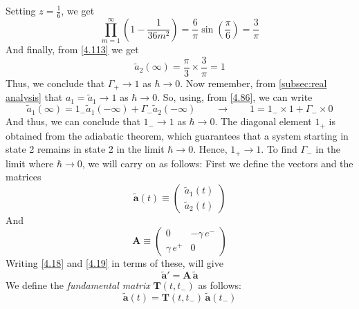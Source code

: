 \documentclass[12pt,a4paper]{article}
\begin{document}
	Setting $z = \frac{1}{6}$, we get
	\begin{equation}
		\prod_{m = 1}^{\infty} \left( 1 - \frac{1}{36m^{2}} \right) = \frac{6}{\pi} \sin(\frac{\pi}{6}) = \frac{3}{\pi} \label{4.116}
	\end{equation}
	And finally, from \eqref{4.113} we get
	\begin{equation}
		\tilde{a}_{2}(\infty) = \frac{\pi}{3} \times \frac{3}{\pi} = 1 \label{4.117}
	\end{equation}
	Thus, we conclude that $\Gamma_{+} \rightarrow 1$ as $\hbar \rightarrow 0$. Now remember, from \ref{subsec:real analysis} that $a_{1} = \tilde{a}_{1} \rightarrow 1$ as $\hbar \rightarrow 0$. So, using, from \eqref{4.86}, we can write
	\begin{equation}
		\tilde{a}_{1} (\infty) = 1_{-} \tilde{a}_{1}(-\infty) + \Gamma_{-} \tilde{a}_{2}(-\infty) \qquad \rightarrow \qquad 1 = 1_{-} \times 1 + \Gamma_{-} \times 0 \label{4.118}
	\end{equation}
	And thus, we can conclude that $1_{-} \rightarrow 1$ as $\hbar \rightarrow 0$. The diagonal element $1_+$ is obtained from the adiabatic theorem, which guarantees that a system starting in state 2 remains in state 2 in the limit $\hbar \to 0$. Hence, $1_+ \to 1$. To find $\Gamma_{-}$ in the limit where $\hbar \rightarrow 0$, we will carry on as follows: First we define the vectors and the matrices
	\begin{equation}
		\boldsymbol{\tilde{a}}(t) \equiv
		\begin{pmatrix}
			\tilde{a}_{1}(t) \\[5pt]
			\tilde{a}_{2}(t)
		\end{pmatrix} \label{4.119}
	\end{equation}
	And
	\begin{equation}
		\mathbf{A} \equiv
		\begin{pmatrix}
			0 & -\gamma\, e^{-} \\[5pt]
			\gamma\, e^{+} & 0
		\end{pmatrix} \label{4.120}
	\end{equation}
	Writing \eqref{4.18} and \eqref{4.19} in terms of these, will give
	\begin{equation}
		\boldsymbol{\tilde{a}}' = \mathbf{A}\, \boldsymbol{\tilde{a}} \label{4.121}
	\end{equation}
	We define the \emph{fundamental matrix} $\mathbf{T}(t, t_{-})$ as follows:
	\begin{equation}
		\boldsymbol{\tilde{a}}(t) = \mathbf{T}(t, t_{-})\,  \boldsymbol{\tilde{a}}(t_{-}) \label{4.122}
	\end{equation}
\end{document}
